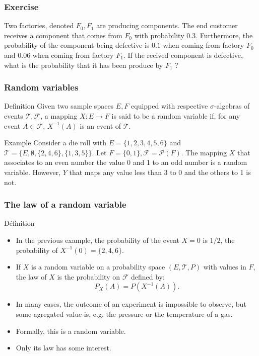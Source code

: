 \begin{frame}
    \frametitle{Exercise}
Two factories, denoted $F_0, F_1$ are producing components.  The end customer 
receives a component that comes from $F_0$ with probability $0.3$. Furthermore,
the probability of the component being defective is $0.1$ when coming from factory $F_0$
and $0.06$ when coming from factory $F_1$. If the recived component is defective,
what is the probability that it has been produce by $F_1$ ?

\end{frame}
\begin{frame}
    \frametitle{Random variables}
\begin{block}{Definition}
    Given two sample spaces $E,F$ equipped with respective $\sigma$-algebras of events 
    $\mathcal{T},\mathcal{F}$, a mapping $X \colon E \to F$ is said to be 
    a random variable if, for any event $A \in \mathcal{F}$, $X^{-1}\left( A \right)$
    is an event of $\mathcal{T}.$
\end{block}
\begin{block}{Example}
    Consider a die roll with $E=\{1,2,3,4,5,6\}$ and 
    $\mathcal{T}=\{E,\emptyset,\{2,4,6\},\{1,3,5\}\}$. Let $F=\{0,1\}, \mathcal{F}=\mathcal{P}(F).$
    The mapping $X$ that associates to an even number the value 0 and 1 to an odd number
    is a random variable. However, $Y$ that maps any value less than 3 to 0 and the
    others to 1 is not.
\end{block}
\end{frame}
\begin{frame}
    \frametitle{The law of a random variable}
\begin{block}{Définition}
    \begin{itemize}
        \item<+-> In the previous example,  
        the probability of the event $X=0$ is $1/2$, the probability of  
        $X^{-1}\left( 0 \right)=\{2,4,6\}.$
        \item<+-> If $X$ is a random variable on a probability space $\left( E,\mathcal{T},P \right)$
        with values in $F$, the law of $X$ is the probability on $\mathcal{F}$ defined by:
        \begin{equation}
            P_X \left( A \right) = P \left( X^{-1}(A) \right).
        \end{equation}
    \item<+-> In many cases, the outcome of an experiment is impossible to observe, but 
    some agregated value is, e.g. the pressure or the temperature of a gas.
    \item<+-> Formally, this is a random variable.
    \item<+-> Only its law has some interest.
   \end{itemize} 
\end{block}    
\end{frame}

